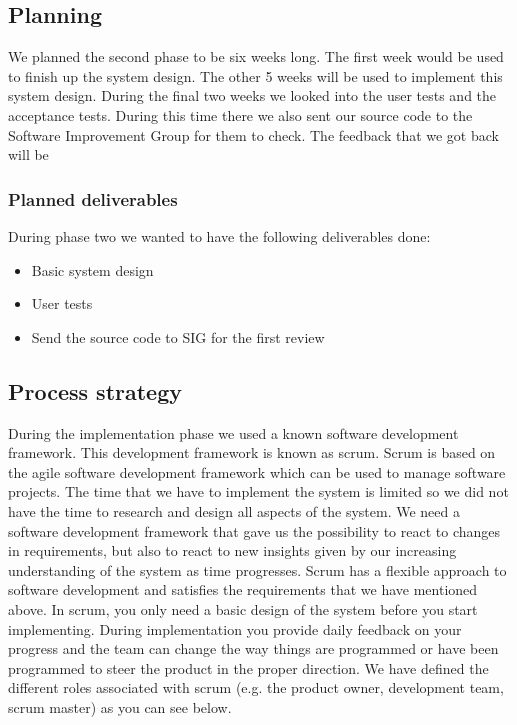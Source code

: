 \subsection{Planning}
We planned the second phase to be six weeks long.
The first week would be used to finish up the system design.
The other 5 weeks will be used to implement this system design.
During the final two weeks we looked into the user tests and the acceptance tests.
During this time there we also sent our source code to the Software Improvement Group for them to check.
The feedback that we got back will be 

\subsubsection{Planned deliverables}
During phase two we wanted to have the following deliverables done:
\begin{itemize}
\item Basic system design
\item User tests
\item Send the source code to SIG for the first review
\end{itemize}

\subsection{Process strategy}
During the implementation phase we used a known software development framework.
This development framework is known as scrum.
Scrum is based on the agile software development framework which can be used to 
manage software projects.
The time that we have to implement the system is limited so we did not have the time to research and design all aspects of the system. We need a software development framework that gave us the possibility to react to changes in requirements, but also to react to new insights given by our increasing understanding of the system as time progresses.
Scrum has a flexible approach to software development and satisfies the requirements that we have mentioned above.
In scrum, you only need a basic design of the system before you start implementing.
During implementation you provide daily feedback on your progress and the team can change the way things are programmed or have been programmed to steer the product in the proper direction.
We have defined the different roles associated with scrum (e.g. the product owner, development team, scrum master) as you can see below.

